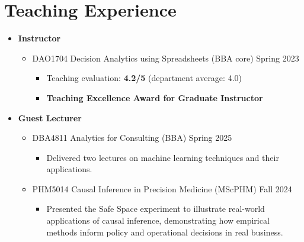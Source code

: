 \documentclass[12pt, a4paper]{article}
\begin{document}
{%

\section*{Teaching Experience}

\begin{itemize}

	\item[] \textbf{Instructor}
	\begin{itemize}
		\item DAO1704 Decision Analytics using Spreadsheets (BBA core) \hfill Spring 2023
		\begin{itemize}
			\item {\footnotesize Teaching evaluation: \textbf{4.2/5} (department average: 4.0)}
			\item {\footnotesize \textbf{Teaching Excellence Award for Graduate Instructor}}
		\end{itemize}
	\end{itemize}

	\item[] \textbf{Guest Lecturer}
	\begin{itemize}
		\item DBA4811 Analytics for Consulting (BBA) \hfill Spring 2025
		\begin{itemize}
			\item {\footnotesize Delivered two lectures on machine learning techniques and their applications.}
		\end{itemize}
		\item PHM5014 Causal Inference in Precision Medicine (MScPHM) \hfill Fall 2024
		\begin{itemize}
			\item {\footnotesize Presented the Safe Space experiment to illustrate real-world applications of causal inference, demonstrating how empirical methods inform policy and operational decisions in real business.}
		\end{itemize}
	\end{itemize}


\end{itemize}}
\end{document}
